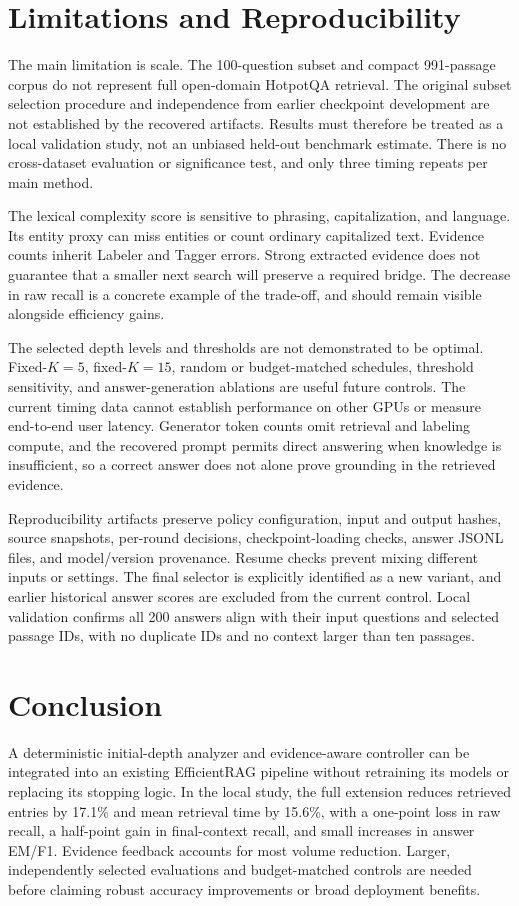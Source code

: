 \documentclass[conference]{IEEEtran}
\begin{document}
\section{Limitations and Reproducibility}
The main limitation is scale. The 100-question subset and compact 991-passage corpus do not represent full open-domain HotpotQA retrieval. The original subset selection procedure and independence from earlier checkpoint development are not established by the recovered artifacts. Results must therefore be treated as a local validation study, not an unbiased held-out benchmark estimate. There is no cross-dataset evaluation or significance test, and only three timing repeats per main method.

The lexical complexity score is sensitive to phrasing, capitalization, and language. Its entity proxy can miss entities or count ordinary capitalized text. Evidence counts inherit Labeler and Tagger errors. Strong extracted evidence does not guarantee that a smaller next search will preserve a required bridge. The decrease in raw recall is a concrete example of the trade-off, and should remain visible alongside efficiency gains.

The selected depth levels and thresholds are not demonstrated to be optimal. Fixed-$K=5$, fixed-$K=15$, random or budget-matched schedules, threshold sensitivity, and answer-generation ablations are useful future controls. The current timing data cannot establish performance on other GPUs or measure end-to-end user latency. Generator token counts omit retrieval and labeling compute, and the recovered prompt permits direct answering when knowledge is insufficient, so a correct answer does not alone prove grounding in the retrieved evidence.

Reproducibility artifacts preserve policy configuration, input and output hashes, source snapshots, per-round decisions, checkpoint-loading checks, answer JSONL files, and model/version provenance. Resume checks prevent mixing different inputs or settings. The final selector is explicitly identified as a new variant, and earlier historical answer scores are excluded from the current control. Local validation confirms all 200 answers align with their input questions and selected passage IDs, with no duplicate IDs and no context larger than ten passages.

\section{Conclusion}
A deterministic initial-depth analyzer and evidence-aware controller can be integrated into an existing EfficientRAG pipeline without retraining its models or replacing its stopping logic. In the local study, the full extension reduces retrieved entries by 17.1\% and mean retrieval time by 15.6\%, with a one-point loss in raw recall, a half-point gain in final-context recall, and small increases in answer EM/F1. Evidence feedback accounts for most volume reduction. Larger, independently selected evaluations and budget-matched controls are needed before claiming robust accuracy improvements or broad deployment benefits.
\end{document}
